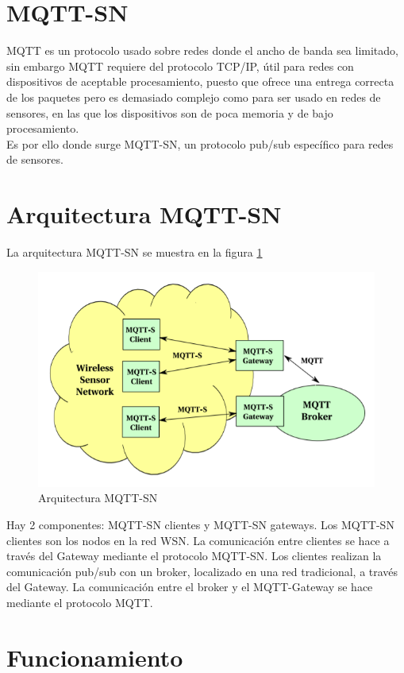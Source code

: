 \documentclass[12pt, twoside]{book}
\begin{document}
\section{MQTT-SN}
MQTT es un protocolo usado sobre redes donde el ancho de banda sea limitado, sin embargo MQTT requiere del protocolo TCP/IP, útil para redes con dispositivos de aceptable procesamiento, puesto que ofrece una entrega correcta de los paquetes pero es demasiado complejo como para ser usado en redes de sensores, en las que los dispositivos son de poca memoria y de bajo procesamiento.\\
Es por ello donde surge MQTT-SN, un protocolo pub/sub específico para redes de sensores. 
\section{Arquitectura MQTT-SN}
La arquitectura MQTT-SN se muestra en la figura \ref{L412}
\begin{figure}[H]
\centering
\includegraphics[scale=0.5]{images/mqttsn}
\caption{Arquitectura MQTT-SN}\label{L412}
\end{figure}
Hay 2 componentes: MQTT-SN clientes y MQTT-SN gateways. Los MQTT-SN clientes son los nodos en la red WSN. La comunicación entre clientes se hace a través del Gateway mediante el protocolo MQTT-SN. Los clientes realizan la comunicación pub/sub con un broker, localizado en una red tradicional, a través del Gateway. La comunicación entre el broker y el MQTT-Gateway se hace mediante el protocolo MQTT.
\section{Funcionamiento}  
\end{document}
